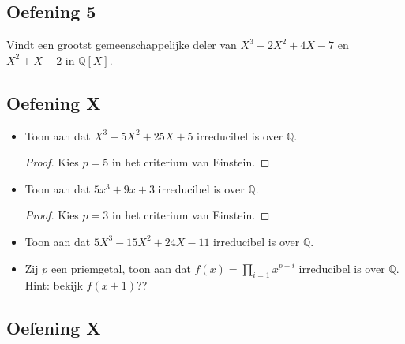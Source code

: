 \documentclass[main.tex]{subfiles}
\begin{document}
\subsection*{Oefening 5}
Vindt een grootst gemeenschappelijke deler van $X^{3}+2X^{2}+4X-7$ en $X^{2}+X-2$ in $\mathbb{Q}[X]$.


\subsection*{Oefening X}
\begin{itemize}
\item Toon aan dat $X^{3}+5X^{2}+25X+5$ irreducibel is over $\mathbb{Q}$.
  \begin{proof}
    Kies $p=5$ in het criterium van Einstein.
  \end{proof}
\item Toon aan dat $5x^{3}+9x+3$ irreducibel is over $\mathbb{Q}$.
  \begin{proof}
    Kies $p=3$ in het criterium van Einstein.
  \end{proof}
\item Toon aan dat $5X^{3}-15X^{2}+24X-11$ irreducibel is over $\mathbb{Q}$.
\item Zij $p$ een priemgetal, toon aan dat $f(x)= \prod_{i=1} x^{p-i}$ irreducibel is over $\mathbb{Q}$.
  Hint: bekijk $f(x+1)$??
\end{itemize}


\subsection*{Oefening X}
\end{document}
